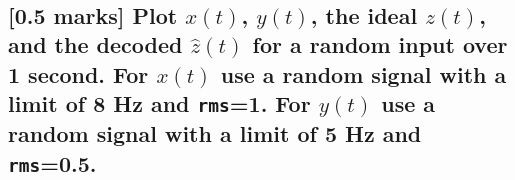 \documentclass{article}
\begin{document}
    \begin{center}
    \end{center}
    { \hspace*{\fill} \\}
    
\subsection{{[}0.5 marks{]} Plot $x(t)$, $y(t)$, the ideal $z(t)$, and
the decoded $\hat{z}(t)$ for a random input over 1 second. For $x(t)$
use a random signal with a limit of 8 Hz and \texttt{rms}=1. For $y(t)$
use a random signal with a limit of 5 Hz and
\texttt{rms}=0.5.}\label{marks-plot-xt-yt-the-ideal-zt-and-the-decoded-hatzt-for-a-random-input-over-1-second.-for-xt-use-a-random-signal-with-a-limit-of-8-hz-and-rms1.-for-yt-use-a-random-signal-with-a-limit-of-5-hz-and-rms0.5.}
\end{document}
